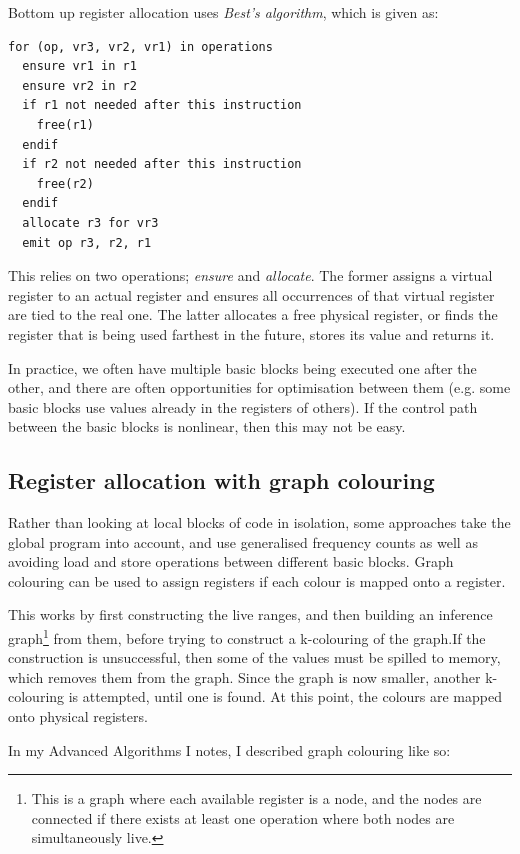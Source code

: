 Bottom up register allocation uses \textit{Best's algorithm}, which is
given as:

\begin{verbatim}
for (op, vr3, vr2, vr1) in operations
  ensure vr1 in r1
  ensure vr2 in r2
  if r1 not needed after this instruction
    free(r1)
  endif
  if r2 not needed after this instruction
    free(r2)
  endif
  allocate r3 for vr3
  emit op r3, r2, r1
\end{verbatim}

This relies on two operations; \textit{ensure}
and \textit{allocate}. The former assigns a virtual register to an
actual register and ensures all occurrences of that virtual register
are tied to the real one. The latter allocates a free physical
register, or finds the register that is being used farthest in the
future, stores its value and returns it.

In practice, we often have multiple basic blocks being executed one
after the other, and there are often opportunities for optimisation
between them (e.g. some basic blocks use values already in the
registers of others). If the control path between the basic blocks is
nonlinear, then this may not be easy.


\subsection{Register allocation with graph colouring}

Rather than looking at local blocks of code in isolation, some
approaches take the global program into account, and use generalised
frequency counts as well as avoiding load and store operations between
different basic blocks. Graph colouring can be used to assign
registers if each colour is mapped onto a register.

This works by first constructing the live ranges, and then building an
inference graph\footnote{This is a graph where each available register
is a node, and the nodes are connected if there exists at least one
operation where both nodes are simultaneously live.} from them, before
trying to construct a k-colouring of the graph.If the construction is
unsuccessful, then some of the values must be spilled to memory, which
removes them from the graph. Since the graph is now smaller, another
k-colouring is attempted, until one is found. At this point, the
colours are mapped onto physical registers.

In my Advanced Algorithms I notes, I described graph colouring like
so:

